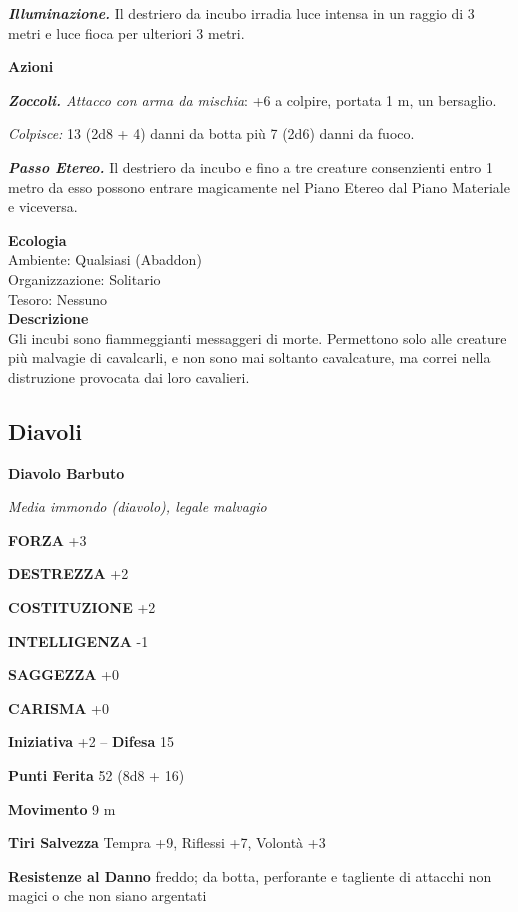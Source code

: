 \begin{multicols}{2}
\emph{\textbf{Illuminazione.}} Il destriero da incubo irradia luce intensa in un raggio di 3 metri e luce fioca per ulteriori 3 metri.

\textbf{Azioni}

\emph{\textbf{Zoccoli.} Attacco con arma da mischia}: +6 a colpire, portata 1 m, un bersaglio.

\emph{Colpisce:} 13 (2d8 + 4) danni da botta più 7 (2d6) danni da fuoco.

\emph{\textbf{Passo Etereo.}} Il destriero da incubo e fino a tre creature consenzienti entro 1 metro da esso possono entrare magicamente nel Piano Etereo dal Piano Materiale e viceversa.

\textbf{Ecologia}\\
Ambiente: Qualsiasi (Abaddon)\\
Organizzazione: Solitario\\
Tesoro: Nessuno\\
\textbf{Descrizione}\\
Gli incubi sono fiammeggianti messaggeri di morte. Permettono solo alle creature più malvagie di cavalcarli, e non sono mai soltanto cavalcature, ma correi nella distruzione provocata dai loro cavalieri.\\



\subsection{Diavoli}

\medskip{}\textbf{Diavolo Barbuto}

\emph{Media immondo (diavolo), legale malvagio}

\textbf{FORZA} +3

\textbf{DESTREZZA} +2

\textbf{COSTITUZIONE} +2

\textbf{INTELLIGENZA} -1

\textbf{SAGGEZZA} +0

\textbf{CARISMA} +0

\textbf{Iniziativa} +2 -- \textbf{Difesa} 15

\textbf{Punti Ferita} 52 (8d8 + 16)

\textbf{Movimento} 9 m

\textbf{Tiri Salvezza} Tempra +9, Riflessi +7, Volontà +3

\textbf{Resistenze al Danno} freddo; da botta, perforante e tagliente di attacchi non magici o che non siano argentati


\end{multicols}
